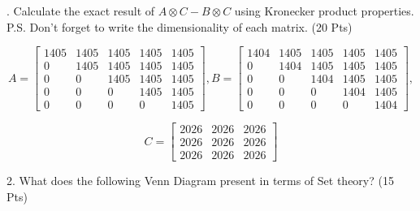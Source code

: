 . Calculate the exact result of $A \otimes C - B \otimes C$ using Kronecker product properties. \\
P.S. Don't forget to write the dimensionality of each matrix. (20 Pts)

$$A = \begin{bmatrix}
1405 & 1405 & 1405 & 1405 & 1405 \\
0 & 1405 & 1405 & 1405 & 1405 \\
0 & 0 & 1405 & 1405 & 1405 \\
0 & 0 & 0 & 1405 & 1405 \\
0 & 0 & 0 & 0 & 1405
\end{bmatrix}, B = \begin{bmatrix}
1404 & 1405 & 1405 & 1405 & 1405 \\
0 & 1404 & 1405 & 1405 & 1405 \\
0 & 0 & 1404 & 1405 & 1405 \\
0 & 0 & 0 & 1404 & 1405 \\
0 & 0 & 0 & 0 & 1404
\end{bmatrix},$$

$$C = \begin{bmatrix}
2026 & 2026 & 2026 \\
2026 & 2026 & 2026 \\
2026 & 2026 & 2026
\end{bmatrix}$$

2. What does the following Venn Diagram present in terms of Set theory? (15 Pts)

\begin{center}
\end{center}

